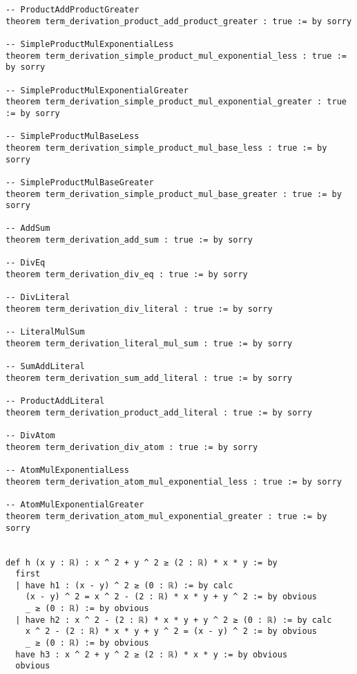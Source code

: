 \documentclass{article}
\begin{document}
\begin{tcolorbox}[colback=white!10, width=\linewidth]
\begin{lstlisting}[language=Lean4]
-- ProductAddProductGreater
theorem term_derivation_product_add_product_greater : true := by sorry

-- SimpleProductMulExponentialLess
theorem term_derivation_simple_product_mul_exponential_less : true := by sorry

-- SimpleProductMulExponentialGreater
theorem term_derivation_simple_product_mul_exponential_greater : true := by sorry

-- SimpleProductMulBaseLess
theorem term_derivation_simple_product_mul_base_less : true := by sorry

-- SimpleProductMulBaseGreater
theorem term_derivation_simple_product_mul_base_greater : true := by sorry

-- AddSum
theorem term_derivation_add_sum : true := by sorry

-- DivEq
theorem term_derivation_div_eq : true := by sorry

-- DivLiteral
theorem term_derivation_div_literal : true := by sorry

-- LiteralMulSum
theorem term_derivation_literal_mul_sum : true := by sorry

-- SumAddLiteral
theorem term_derivation_sum_add_literal : true := by sorry

-- ProductAddLiteral
theorem term_derivation_product_add_literal : true := by sorry

-- DivAtom
theorem term_derivation_div_atom : true := by sorry

-- AtomMulExponentialLess
theorem term_derivation_atom_mul_exponential_less : true := by sorry

-- AtomMulExponentialGreater
theorem term_derivation_atom_mul_exponential_greater : true := by sorry


def h (x y : ℝ) : x ^ 2 + y ^ 2 ≥ (2 : ℝ) * x * y := by
  first
  | have h1 : (x - y) ^ 2 ≥ (0 : ℝ) := by calc
    (x - y) ^ 2 = x ^ 2 - (2 : ℝ) * x * y + y ^ 2 := by obvious
    _ ≥ (0 : ℝ) := by obvious
  | have h2 : x ^ 2 - (2 : ℝ) * x * y + y ^ 2 ≥ (0 : ℝ) := by calc
    x ^ 2 - (2 : ℝ) * x * y + y ^ 2 = (x - y) ^ 2 := by obvious
    _ ≥ (0 : ℝ) := by obvious
  have h3 : x ^ 2 + y ^ 2 ≥ (2 : ℝ) * x * y := by obvious
  obvious

\end{lstlisting}
\end{tcolorbox}
\end{document}
